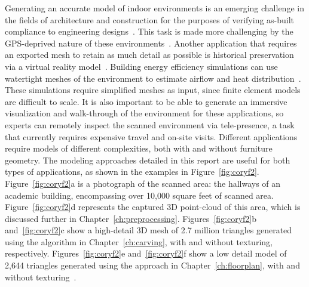 \documentclass[12pt,onecolumn,oneside]{book}
\begin{document}
Generating an accurate model of indoor environments is an emerging challenge in the fields of architecture and construction for the purposes of verifying as-built compliance to engineering designs~\cite{Bosche10,Xiong13}.  This task is made more challenging by the GPS-deprived nature of these environments~\cite{Liang13}.  Another application that requires an exported mesh to retain as much detail as possible is historical preservation via a virtual reality model~\cite{VillageHeritage,Carving}.  Building energy efficiency simulations can use watertight meshes of the environment to estimate airflow and heat distribution~\cite{EnergyPlus}.  These simulations require simplified meshes as input, since finite element models are difficult to scale.  It is also important to be able to generate an immersive visualization and walk-through of the environment for these applications, so experts can remotely inspect the scanned environment via tele-presence, a task that currently requires expensive travel and on-site visits.  Different applications require models of different complexities, both with and without furniture geometry.  The modeling approaches detailed in this report are useful for both types of applications, as shown in the examples in Figure~\ref{fig:coryf2}.  Figure~\ref{fig:coryf2}a is a photograph of the scanned area: the hallways of an academic building, encompassing over 10,000 square feet of scanned area.  Figure~\ref{fig:coryf2}d represents the captured 3D point-cloud of this area, which is discussed further in Chapter~\ref{ch:preprocessing}.  Figures~\ref{fig:coryf2}b and~\ref{fig:coryf2}c show a high-detail 3D mesh of 2.7 million triangles generated using the algorithm in Chapter~\ref{ch:carving}, with and without texturing, respectively.  Figures~\ref{fig:coryf2}e and~\ref{fig:coryf2}f show a low detail model of 2,644 triangles generated using the approach in Chapter~\ref{ch:floorplan}, with and without texturing~\cite{Turner14Journal}.
\end{document}
